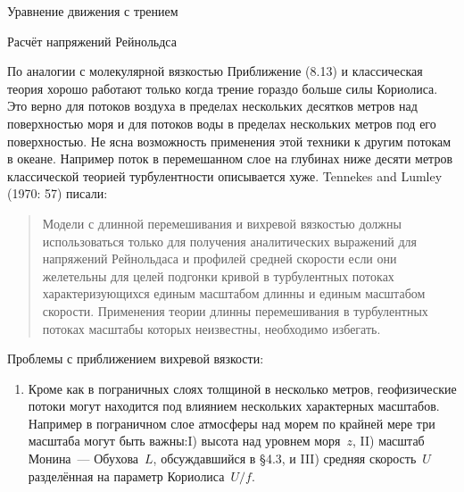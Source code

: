 \begin{chapter}{Уравнение движения с трением}
\begin{section}{Расчёт напряжений Рейнольдса}
\begin{paragraph}{По аналогии с молекулярной вязкостью}
Приближение (8.13) и классическая теория хорошо работают только когда
трение гораздо больше силы Кориолиса. Это верно для потоков воздуха в
пределах нескольких десятков метров над поверхностью моря и для
потоков воды в пределах нескольких метров под его поверхностью. Не
ясна возможность применения этой техники к другим потокам в
океане. Например поток в перемешанном слое на глубинах ниже десяти
метров классической теорией турбулентности описывается хуже. Tennekes
and Lumley (1970: 57) писали:
%
\begin{quotation}
Модели с длинной перемешивания и вихревой вязкостью должны
использоваться только для получения аналитических выражений для
напряжений Рейнольдаса и профилей средней скорости если они желетельны
для целей подгонки кривой в турбулентных потоках характеризующихся
единым масштабом длинны и единым масштабом скорости. Применения теории
длинны перемешивания в турбулентных потоках масштабы которых
неизвестны, необходимо избегать.
%
\end{quotation}

Проблемы с приближением вихревой вязкости:
%
\begin{enumerate}
\item 
Кроме как в пограничных слоях толщиной в несколько метров,
геофизические потоки могут находится под влиянием нескольких
характерных масштабов. Например в пограничном слое атмосферы над морем
по крайней мере три масштаба могут быть важны:I) высота над уровнем
моря~$z$, II) масштаб Монина~--- Обухова~$L$, обсуждавшийся в \S4.3, и
III) средняя скорость~$U$ разделённая на параметр Кориолиса~$U/f$.
%


\end{enumerate}
\end{paragraph}
\end{section}
\end{chapter}
